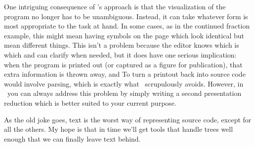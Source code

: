 One intriguing consequence of \Meta's approach is that the visualization of the program no longer has to be unambiguous. Instead, it can take whatever form is most appropriate to the task at hand. In some cases, as in the continued fraction example, this might mean having symbols on the page which look identical but mean different things. This isn't a problem because the editor knows which is which and can clarify when needed, but it does have one serious implication: when the program is printed out (or captured as a figure for publication), that extra information is thrown away, and  To turn a printout back into source code would involve parsing, which is exactly what \Meta\ scrupulously avoids. However, in \Meta\ you can always address this problem by simply writing a second presentation reduction which is better suited to your current purpose.

As the old joke goes, text is the worst way of representing source code, except for all the others. My hope is that in time we'll get tools that handle trees well enough that we can finally leave text behind.